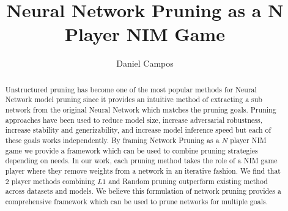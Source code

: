 \documentclass[runningheads]{llncs}
\begin{document}
\title{Neural Network Pruning as a N Player NIM Game}
\author{Daniel Campos }
\maketitle              %
%
\begin{abstract}
Unstructured pruning has become one of the most popular methods for Neural Network model pruning since it provides an intuitive method of extracting a sub network from the original Neural Network which matches the pruning goals. Pruning approaches have been used to reduce model size, increase adversarial robustness, increase stability and generizability, and increase model inference speed but each of these goals works independently. By framing Network Pruning as a $N$ player NIM game we provide a framework which can be used to combine pruning strategies depending on needs. In our work, each pruning method takes the role of a NIM game player where they remove weights from a network in an iterative fashion. We find that 2 player methods combining $L1$ and Random pruning outperform existing method across datasets and models. We believe this formulation of network pruning provides a comprehensive framework which can be used to prune networks for multiple goals. 
\end{abstract}
\end{document}
